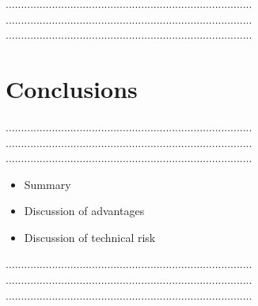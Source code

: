 \documentclass[final,3p,times,twocolumn]{elsarticle} %
\begin{document}
................................................................................\\
................................................................................\\
................................................................................\\

\section{Conclusions}

................................................................................\\
................................................................................\\
................................................................................\\


\begin{itemize}
\item Summary
\item Discussion of advantages
\item Discussion of technical risk
\end{itemize}

................................................................................\\
................................................................................\\
................................................................................\\



\onehalfspacing



\end{document}
